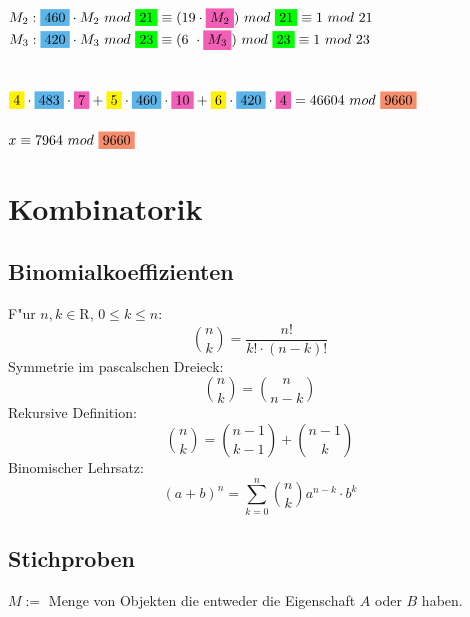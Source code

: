 \documentclass[10pt,a4paper,landscape]{article}
\begin{document}
\begin{multicols*}{3}
\begin{minipage}{\linewidth}
\begin{onehalfspacing}
				$M_2: \colorbox{CornflowerBlue}{460} \cdot M_2~mod~\colorbox{green}{21} \equiv (19\cdot \colorbox{CarnationPink}{$M_2$})~mod~\colorbox{green}{21} \equiv 1~mod~21$\\
				$M_3: \colorbox{CornflowerBlue}{420} \cdot M_3~mod~\colorbox{green}{23} \equiv (6~\cdot \colorbox{CarnationPink}{$M_3$})~mod~\colorbox{green}{23} \equiv 1~mod~23$\\
				\\
				\\
				$\colorbox{yellow}{4} \cdot \colorbox{CornflowerBlue}{483} \cdot  \colorbox{CarnationPink}{7} + \colorbox{yellow}{5} \cdot \colorbox{CornflowerBlue}{460} \cdot  \colorbox{CarnationPink}{10} + \colorbox{yellow}{6} \cdot \colorbox{CornflowerBlue}{420} \cdot  \colorbox{CarnationPink}{4} = 46604~mod~\colorbox{Melon}{9660}$\\
				\\
				$x \equiv 7964~mod~\colorbox{Melon}{9660}$
			\end{onehalfspacing}
		\end{minipage}
		
		\section{Kombinatorik}
		\subsection{Binomialkoeffizienten}
		F"ur $n,k \in \mathrm{R}$, $0 \leq k \leq n$:\\
		\[ \binom{n}{k} =  \frac{n!}{k! \cdot (n-k)!}  \] 
		Symmetrie im pascalschen Dreieck:\\
		\[ \binom{n}{k} =  \binom{n}{n-k}  \] 
		Rekursive Definition:\\
		\[ \binom{n}{k} =  \binom{n-1}{k-1} + \binom{n-1}{k} \] 
		Binomischer Lehrsatz:\\
		\[ (a+b)^n =  \sum_{k=0}^{n} \binom{n}{k} a^{n-k} \cdot b^k \] 
		\subsection{Stichproben}
		$M := $ Menge von Objekten die entweder die Eigenschaft $A$ oder $B$ haben.
		

\end{multicols*}
\end{document}

